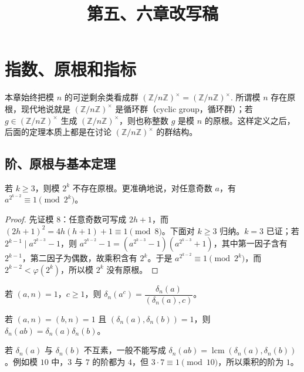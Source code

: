 \documentclass[oneside]{AJbook}
\title{第五、六章改写稿}
\author{}
\date{}
\newcommand{\Z}{\mathbb Z}
\newcommand{\U}[1]{(\Z/#1\Z)^\times}
\begin{document}
\sloppy
\maketitle
\tableofcontents

\mainmatter
\setcounter{chapter}{4}

\chapter{指数、原根和指标}

本章始终把模 $n$ 的可逆剩余类看成群
\(
  \U n=(\Z/n\Z)^\times .
\)
所谓模 $n$ 存在原根，现代地说就是 $\U n$ 是循环群（cyclic group，循环群）；若
$g\in \U n$ 生成 $\U n$，则也称整数 $g$ 是模 $n$ 的原根。这样定义之后，后面的定理本质上都是在讨论
$\U n$ 的群结构。

\section{阶、原根与基本定理}

\begin{theorem}[二的高次幂没有原根]
若 $k\ge 3$，则模 $2^k$ 不存在原根。更准确地说，对任意奇数 $a$，有 $a^{2^{k-2}}\equiv 1\pmod {2^k}$。
\end{theorem}

\begin{proof}
先证模 $8$：任意奇数可写成 $2h+1$，而 $(2h+1)^2=4h(h+1)+1\equiv 1\pmod 8$。下面对 $k\ge3$ 归纳。$k=3$ 已证；若 $2^{k-1}\mid a^{2^{k-3}}-1$，则
$a^{2^{k-2}}-1=(a^{2^{k-3}}-1)(a^{2^{k-3}}+1)$，其中第一因子含有 $2^{k-1}$，第二因子为偶数，故乘积含有 $2^k$。于是 $a^{2^{k-2}}\equiv1\pmod {2^k}$，而 $2^{k-2}<\varphi(2^k)$，所以模 $2^k$ 没有原根。
\end{proof}

\begin{proposition}[幂的阶]
若 $(a,n)=1$，$c\ge 1$，则 $\delta_n(a^c)=\dfrac{\delta_n(a)}{(\delta_n(a),c)}$。
\end{proposition}

\begin{proposition}[互素阶的乘积]
若 $(a,n)=(b,n)=1$ 且 $(\delta_n(a),\delta_n(b))=1$，则 $\delta_n(ab)=\delta_n(a)\delta_n(b)$。
\end{proposition}

\begin{remark}
若 $\delta_n(a)$ 与 $\delta_n(b)$ 不互素，一般不能写成 $\delta_n(ab)=\operatorname{lcm}(\delta_n(a),\delta_n(b))$。例如模 $10$ 中，$3$ 与 $7$ 的阶都为 $4$，但
$3\cdot 7\equiv 1\pmod {10}$，所以乘积的阶为 $1$。
\end{remark}
\end{document}
